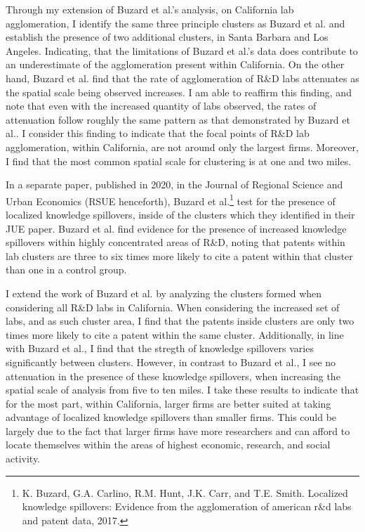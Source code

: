 \documentclass[12pt,letterpaper]{article}
\begin{document}
\par 
 Through my extension of Buzard et al.'s analysis, on California lab agglomeration, I identify the same three principle clusters as Buzard et al. and establish the presence of two additional clusters, in Santa Barbara and Los Angeles. Indicating, that the limitations of Buzard et al.'s data does contribute to an underestimate of the agglomeration present within California. On the other hand, Buzard et al. find that the rate of agglomeration of R\&D labs attenuates as the spatial scale being observed increases. I am able to reaffirm this finding, and note that even with the increased quantity of labs observed, the rates of attenuation follow roughly the same pattern as that demonstrated by Buzard et al.. I consider this finding to indicate that the focal points of R\&D lab agglomeration, within California, are not around only the largest firms. Moreover, I find that the most common spatial scale for clustering is at one and two miles.  
\par
In a separate paper, published in 2020, in the Journal of Regional Science and Urban Economics (RSUE henceforth), Buzard et al.\footnote{K. Buzard, G.A. Carlino, R.M. Hunt, J.K. Carr, and T.E. Smith. Localized knowledge spillovers: Evidence from the agglomeration of american r&d labs and patent data, 2017.} test for the presence of localized knowledge spillovers, inside of the clusters which they identified in their JUE paper. Buzard et al. find evidence for the presence of increased knowledge spillovers within highly concentrated areas of R\&D, noting that patents within lab clusters are three to six times more likely to cite a patent within that cluster than one in a control group. 
\par 
I extend the work of Buzard et al. by analyzing the clusters formed when considering all R\&D labs in California. When considering the increased set of labs, and as such cluster area, I find that the patents inside clusters are only two times more likely to cite a patent within the same cluster. Additionally, in line with Buzard et al., I find that the stregth of knowledge spillovers varies significantly between clusters. However, in contrast to Buzard et al., I see no attenuation in the presence of these knowledge spillovers, when increasing the spatial scale of analysis from five to ten miles. I take these results to indicate that for the most part, within California, larger firms are better suited at taking advantage of localized knowledge spillovers than smaller firms. This could be largely due to the fact that larger firms have more researchers and can afford to locate themselves within the areas of highest economic, research, and social activity.  
\end{document}
